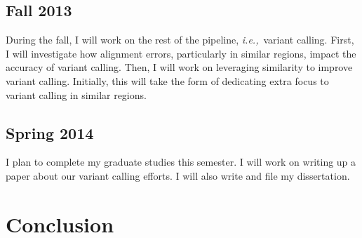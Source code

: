 \documentclass[twocolumn,10pt]{article}
\newcommand{\ie}{{\em i.e.,}~}
\begin{document}
\subsection*{Fall 2013}
During the fall, I will work on the rest of the pipeline, \ie variant calling.  First, I will investigate how alignment errors, particularly in similar regions, impact the accuracy of variant calling.  Then, I will work on leveraging similarity to improve variant calling.  Initially, this will take the form of dedicating extra focus to variant calling in similar regions.

\subsection*{Spring 2014}
I plan to complete my graduate studies this semester.  I will work on writing up a paper about our variant calling efforts.  I will also write and file my dissertation.

\section{Conclusion}

\begin{small}

\end{small}
\end{document}
